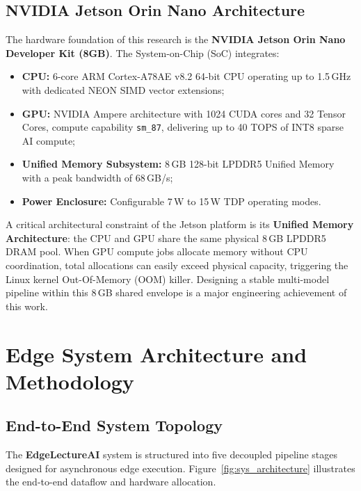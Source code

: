 \documentclass[11pt,a4paper,oneside]{report}
\begin{document}
\section{NVIDIA Jetson Orin Nano Architecture}
The hardware foundation of this research is the \textbf{NVIDIA Jetson Orin Nano Developer Kit (8GB)}. The System-on-Chip (SoC) integrates:
\begin{itemize}[noitemsep]
    \item \textbf{CPU:} 6-core ARM Cortex-A78AE v8.2 64-bit CPU operating up to 1.5\,GHz with dedicated NEON SIMD vector extensions;
    \item \textbf{GPU:} NVIDIA Ampere architecture with 1024 CUDA cores and 32 Tensor Cores, compute capability \texttt{sm\_87}, delivering up to 40 TOPS of INT8 sparse AI compute;
    \item \textbf{Unified Memory Subsystem:} 8\,GB 128-bit LPDDR5 Unified Memory with a peak bandwidth of 68\,GB/s;
    \item \textbf{Power Enclosure:} Configurable 7\,W to 15\,W TDP operating modes.
\end{itemize}

A critical architectural constraint of the Jetson platform is its \textbf{Unified Memory Architecture}: the CPU and GPU share the same physical 8\,GB LPDDR5 DRAM pool. When GPU compute jobs allocate memory without CPU coordination, total allocations can easily exceed physical capacity, triggering the Linux kernel Out-Of-Memory (OOM) killer. Designing a stable multi-model pipeline within this 8\,GB shared envelope is a major engineering achievement of this work.

\chapter{Edge System Architecture and Methodology}
\label{chap:arch}

\section{End-to-End System Topology}
The \textbf{EdgeLectureAI} system is structured into five decoupled pipeline stages designed for asynchronous edge execution. Figure~\ref{fig:sys_architecture} illustrates the end-to-end dataflow and hardware allocation.
\end{document}
